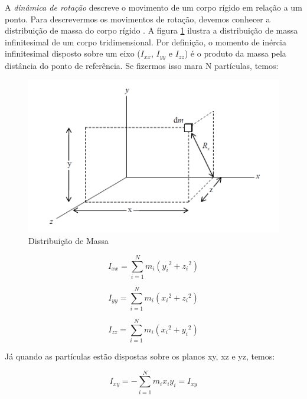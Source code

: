 A \textit{dinâmica de rotação} descreve o movimento de um corpo rígido em relação a um ponto. Para descrevermos os movimentos de rotação, devemos conhecer a distribuição de massa do corpo rígido \cite{Snider}. A figura \ref{fig:mass_snider_p16} ilustra a distribuição de massa infinitesimal de um corpo tridimensional. Por definição, o momento de inércia infinitesimal disposto sobre um eixo ($I_{xx}$, $I_{yy}$ e $I_{zz}$) é o produto da massa pela distância do ponto de referência. Se fizermos isso mara N partículas, temos:

\begin{figure}[H]
  \caption{Distribuição de Massa}
  \begin{center}
      \includegraphics[scale=0.5]{img/mass_snider_p16}
  \end{center}
  \label{fig:mass_snider_p16}
\end{figure}


\begin{equation}
  I_{xx}=\sum_{i=1}^{N}{m_i({y_i}^{2}+{z_i}^{2})}
\end{equation}

\begin{equation}
  I_{yy}=\sum_{i=1}^{N}{m_i({x_i}^{2}+{z_i}^{2})}
\end{equation}

\begin{equation}
  I_{zz}=\sum_{i=1}^{N}{m_i({x_i}^{2}+{y_i}^{2})}
\end{equation}

Já quando as partículas estão dispostas sobre os planos xy, xz e yz, temos:

\begin{equation}
  I_{xy}=-\sum_{i=1}^{N}{m_ix_iy_i}=I_{xy}
\end{equation}

